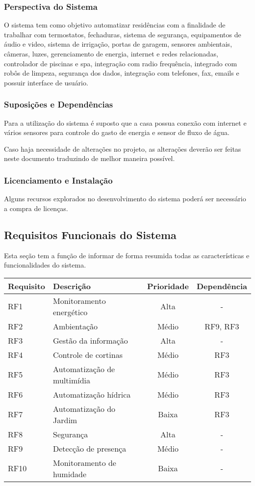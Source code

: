 \subsubsection{Perspectiva do Sistema}

	O sistema tem como objetivo automatizar residências com a finalidade de trabalhar com termostatos, fechaduras, sistema de segurança, equipamentos de áudio e video, sistema de irrigação, portas de garagem, sensores ambientais, câmeras, luzes, gerenciamento de energia, internet e redes relacionadas, controlador de piscinas e spa, integração com radio frequência, integrado com robôs de limpeza, segurança dos dados, integração com telefones, fax, emails  e possuir interface de usuário.

\subsubsection{Suposições e Dependências}

	Para a utilização do sistema é suposto que a casa possua conexão com internet e vários sensores para controle do gasto de energia e sensor de fluxo de água.
	
	Caso haja necessidade de alterações no projeto, as alterações deverão ser feitas neste documento traduzindo de melhor maneira possível.

\subsubsection{Licenciamento e Instalação}

	Alguns recursos explorados no desenvolvimento do sistema poderá ser necessário a compra de licenças.


\subsection{Requisitos Funcionais do Sistema}

	Esta seção tem a função de informar de forma resumida todas as características e funcionalidades do sistema.
	
\begin{tabular}{|l|l|c|c|}
\hline 
\textbf{Requisito} & \textbf{Descrição} & \textbf{Prioridade} & \textbf{Dependência}\tabularnewline
\hline 
\hline 
RF1 & Monitoramento energético & Alta & -\tabularnewline
\hline 
RF2 & Ambientação & Médio & RF9, RF3\tabularnewline
\hline 
RF3 & Gestão da informação & Alta & -\tabularnewline
\hline 
RF4 & Controle de cortinas & Médio & RF3\tabularnewline
\hline 
RF5 & Automatização de multimídia & Médio & RF3\tabularnewline
\hline 
RF6 & Automatização hídrica & Médio & RF3\tabularnewline
\hline 
RF7 & Automatização do Jardim & Baixa & RF3\tabularnewline
\hline 
RF8 & Segurança & Alta & -\tabularnewline
\hline 
RF9 & Detecção de presença & Médio & -\tabularnewline
\hline 
RF10 & Monitoramento de humidade & Baixa & -\tabularnewline
\hline 
\end{tabular}

